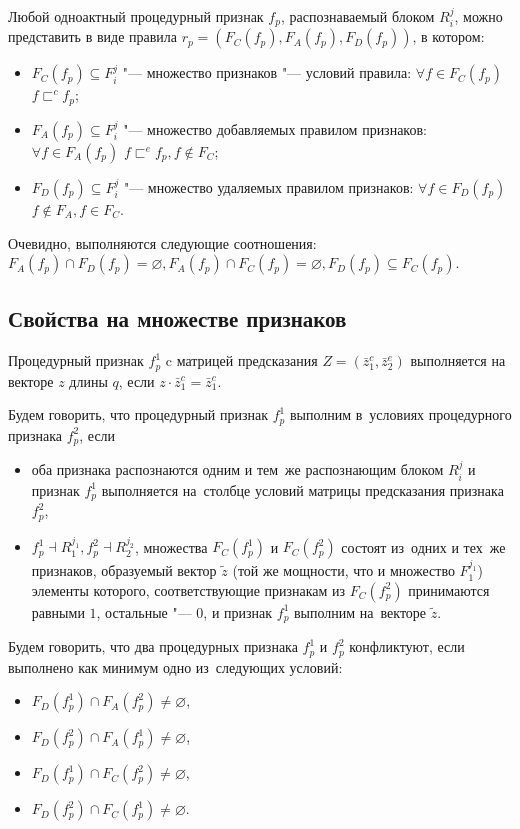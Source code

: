 Любой одноактный процедурный признак $f_p$, распознаваемый блоком $R_i^j$, можно представить в виде правила $r_p=(F_C(f_p),F_A(f_p),F_D(f_p))$, в котором:
\begin{itemize}
	\item $F_C (f_p )\subseteq F_i^j$ "--- множество признаков "--- условий правила: $\forall f\in F_C(f_p)$ $f\sqsubset^c f_p$;
	\item $F_A(f_p)\subseteq F_i^j$ "--- множество добавляемых правилом признаков: $\forall f\in F_A(f_p)$ $f\sqsubset^e f_p,f\notin F_C$;
	\item $F_D(f_p)\subseteq F_i^j$ "--- множество удаляемых правилом признаков: $\forall f\in F_D(f_p)$ $f\notin F_A,f\in F_C$.
\end{itemize}

Очевидно, выполняются следующие соотношения: $F_A(f_p)\cap F_D(f_p)=\varnothing, F_A(f_p)\cap F_C(f_p)=\varnothing, F_D(f_p)\subseteq F_C(f_p)$.

\subsection{Свойства на множестве признаков}

\begin{Def}
	Процедурный признак $f_p^1$ c матрицей предсказания $Z=(\bar z_1^c,\bar z_2^e)$ выполняется на векторе $z$ длины $q$, если $z\cdot \bar z_1^c=\bar z_1^c$.
\end{Def}
Будем говорить, что процедурный признак $f_p^1$ выполним в~условиях процедурного признака $f_p^2$, если 
\begin{itemize}
	\item оба признака распознаются одним и тем~же распознающим блоком $R_i^j$ и признак  $f_p^1$ выполняется на~столбце условий матрицы предсказания признака $f_p^2$,
	\item $f_p^1\dashv R_1^{j_1}, f_p^2\dashv R_2^{j_2}$, множества $F_C(f_p^1 )$ и $F_C(f_p^2)$ состоят из~одних и тех~же признаков, образуемый вектор $\tilde z$ (той же мощности, что и множество $F_1^{j_1}$) элементы которого, соответствующие признакам из $F_C(f_p^2)$ принимаются равными $1$,  остальные "--- $0$, и признак $f_p^1$ выполним на~векторе $\tilde z$. 
\end{itemize}

\begin{Def}
	Будем говорить, что два процедурных признака $f_p^1$ и $f_p^2$ конфликтуют, если выполнено как минимум одно из~следующих условий:
	\begin{itemize}
		\item $F_D(f_p^1)\cap F_A(f_p^2)\not=\varnothing$,
		\item $F_D(f_p^2)\cap F_A(f_p^1)\not=\varnothing$,
		\item $F_D(f_p^1)\cap F_C(f_p^2)\not=\varnothing$,
		\item $F_D(f_p^2)\cap F_C(f_p^1)\not=\varnothing$.
	\end{itemize}
\end{Def}

